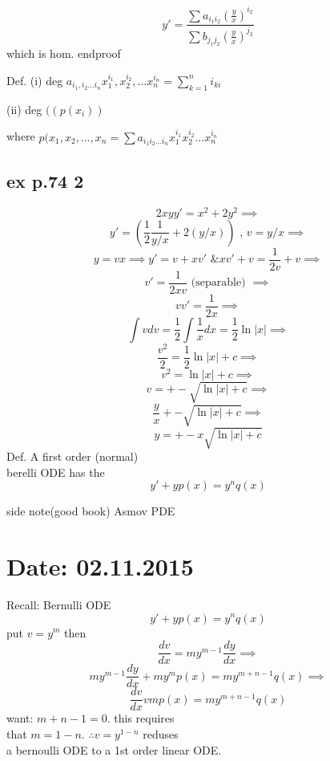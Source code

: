 \documentclass[10pt,a4paper]{article}
\begin{document}
  \[ y' =  \frac{\sum a_{i_1 i_2} (\frac{y}{x})^{i_2}}{\sum b_{j_1 j_2} (\frac{y}{x})^{j_2} }\]
  which is hom. endproof

  Def. (i) deg \( a_{i_1, i_2 ...i_n} x_1^{i_1}, x_2^{i_2}, \dots
  x_n^{i_n} = \sum_{k=1}^{n} i_{k i}\)

  (ii) deg \( ((p(x_i)) \)

  where \( p(x_1, x_2, \dots , x_n = \sum a_{i_1 i_2 \dots i_n}
  x_1^{i_1} x_2^{i_2} \dots x_n^{i_n} \)

  \subsection{ex p.74 2} 

  \[ 2xyy' = x^2 +2y^2 \implies  \]
  \[ y' = (\frac{1}{2} \frac{1}{y/x} + 2(y/x)) \text{ , } v = y/x
  \implies \]
  \[ y = vx \implies y' = v + xv' \text{ \& } xv' +v = \frac{1}{2v} +v
  \implies \]
  \[ v' = \frac{1}{2xv} \text{ (separable) } \implies  \]
  \[ vv' = \frac{1}{2x} \implies \]
  \[ \int v dv = \frac{1}{2} \int \frac{1}{x} dx = \frac{1}{2} \ln |x|
  \implies \]
  \[ \frac{v^2}{2} = \frac{1}{2} \ln |x| + c \implies  \]
  \[ v^2 = \ln |x| + c \implies  \]
  \[ v = +- \sqrt{ \ln |x| + c} \implies \]
  \[ \frac{y}{x} +- \sqrt{\ln |x| + c} \implies  \]
  \[ y = +-x \sqrt{\ln |x| + c} \]
  Def. A first order (normal) \\
  berelli ODE has the 
  \[ y' +yp(x) = y^nq(x) \]

  side note(good book) Asmov PDE 
\section{Date: 02.11.2015}
  Recall: Bernulli ODE
  \[ y' + yp(x) = y^n q(x) \]
  put \( v = y^m \) then
  \[ \frac{dv}{dx} = my^{m-1} \frac{dy}{dx} \implies \]
  \[ my^{m-1} \frac{dy}{dx} + my^m p(x) = my^{m+n-1}  q(x) \implies \]
  \[ \frac{dv}{dx} vmp(x) = my^{m+n-1}  q(x)\]
  want: \( m+n-1=0 \). this requires \\
  that \( m = 1-n \). \( \therefore v=y^{1-n}\) reduses \\
  a bernoulli ODE to a 1st order linear ODE. \\
\end{document}
